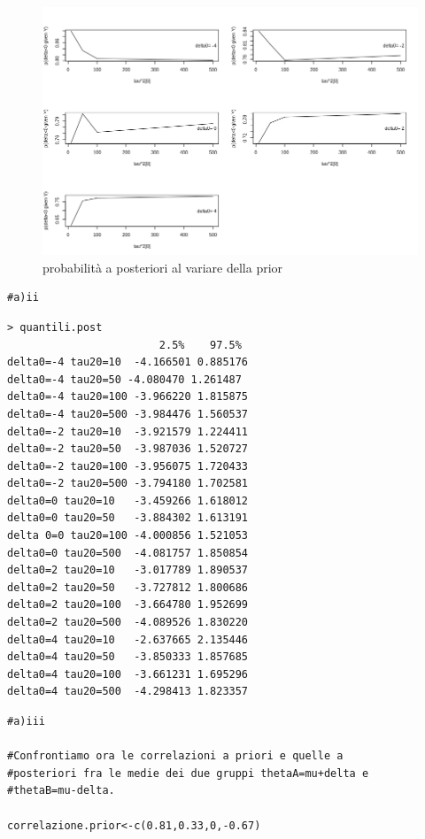 \begin{itemize}[-]
\begin{figure}[!ht]
 \centering
 \includegraphics[scale = 0.7]{img/esercizio8-2-1}
 \caption{probabilità a posteriori al variare della prior}
 \label{figure:figura12}
\end{figure}
\newpage
\begin{lstlisting}[style=R]
#a)ii
\end{lstlisting}
{
\color{red}
\begin{Verbatim}
> quantili.post
                        2.5%    97.5%
delta0=-4 tau20=10  -4.166501 0.885176
delta0=-4 tau20=50 -4.080470 1.261487
delta0=-4 tau20=100 -3.966220 1.815875
delta0=-4 tau20=500 -3.984476 1.560537
delta0=-2 tau20=10  -3.921579 1.224411
delta0=-2 tau20=50  -3.987036 1.520727
delta0=-2 tau20=100 -3.956075 1.720433
delta0=-2 tau20=500 -3.794180 1.702581
delta0=0 tau20=10   -3.459266 1.618012
delta0=0 tau20=50   -3.884302 1.613191
delta 0=0 tau20=100 -4.000856 1.521053
delta0=0 tau20=500  -4.081757 1.850854
delta0=2 tau20=10   -3.017789 1.890537
delta0=2 tau20=50   -3.727812 1.800686
delta0=2 tau20=100  -3.664780 1.952699
delta0=2 tau20=500  -4.089526 1.830220
delta0=4 tau20=10   -2.637665 2.135446
delta0=4 tau20=50   -3.850333 1.857685
delta0=4 tau20=100  -3.661231 1.695296
delta0=4 tau20=500  -4.298413 1.823357
\end{Verbatim}
}

\begin{lstlisting}[style=R]
#a)iii

#Confrontiamo ora le correlazioni a priori e quelle a
#posteriori fra le medie dei due gruppi thetaA=mu+delta e 
#thetaB=mu-delta.

correlazione.prior<-c(0.81,0.33,0,-0.67)


\end{lstlisting}
\end{itemize}
